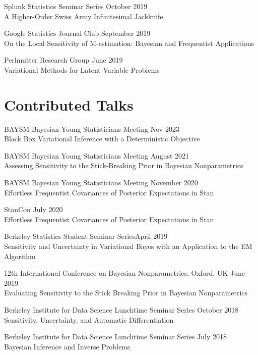 Splunk Statistics Seminar Series \hfill October 2019\\
A Higher-Order Swiss Army Infinitesimal Jackknife

Google Statistics Journal Club \hfill September 2019\\
On the Local Sensitivity of M-estimation: Bayesian and Frequentist Applications

Perlmutter Research Group \hfill June 2019 \\
Variational Methods for Latent Variable Problems



\section{\sc Contributed Talks}

BAYSM Bayesian Young Statisticians Meeting 
\hfill Nov 2023\\
Black Box Variational Inference with a Deterministic Objective

BAYSM Bayesian Young Statisticians Meeting
\hfill August 2021\\
Assessing Sensitivity to the Stick-Breaking Prior in Bayesian Nonparametrics

BAYSM Bayesian Young Statisticians Meeting
\hfill November 2020\\
Effortless Frequentist Covariances of Posterior Expectations in Stan

StanCon \hfill July 2020\\
Effortless Frequentist Covariances of Posterior Expectations in Stan

Berkeley Statistics Student Seminar Series\hfill April 2019\\
Sensitivity and Uncertainty in Variational Bayes with an Application to the
EM Algorithm

12th International Conference on Bayesian Nonparametrics, Oxford, UK
\hfill June 2019\\
Evaluating Sensitivity to the Stick Breaking Prior in Bayesian Nonparametrics

Berkeley Institute for Data Science Lunchtime Seminar Series \hfill October 2018\\
Sensitivity, Uncertainty, and Automatic Differentiation

Berkeley Institute for Data Science Lunchtime Seminar Series \hfill July 2018\\
Bayesian Inference and Inverse Problems


